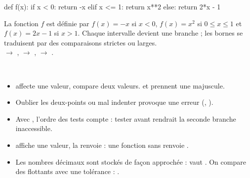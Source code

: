 \begin{exemple}
\begin{codecote}[0.44]
\begin{pythoncol}
def f(x):
    if x < 0:
        return -x
    elif x <= 1:
        return x**2
    else:
        return 2*x - 1
\end{pythoncol}

\medskip
La fonction $f$ est définie par $f(x)=-x$ si $x<0$, $f(x)=x^{2}$ si $0\leq x\leq1$ et $f(x)=2x-1$ si $x>1$. Chaque intervalle devient une
branche ; les bornes se traduisent par des comparaisons strictes ou larges.\\[1mm]
 $\to$ ,\enspace {} $\to$ ,\enspace {} $\to$ .
\cote
\centering
{}\\[0.5mm]
\end{codecote}
\end{exemple}

\begin{attention}
\begin{itemize}[label={\color{otOrange}\textbullet},leftmargin=1.4em,itemsep=0.6mm,topsep=0.5mm]
  \item \code{=} affecte une valeur, \code{==} compare deux valeurs.  et  prennent une majuscule.
  \item Oublier les deux-points ou mal indenter provoque une erreur (, ).
  \item Avec , l'ordre des tests compte : tester  avant  rendrait la seconde branche inaccessible.
  \item {} affiche une valeur,  la renvoie : une fonction sans  renvoie .
  \item Les nombres décimaux sont stockés de façon approchée :  vaut . On compare des flottants
    avec une tolérance : .
\end{itemize}
\end{attention}

